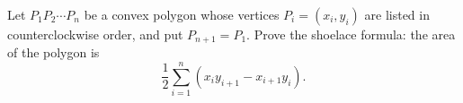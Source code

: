 Let $P_1P_2\cdots P_n$ be a convex polygon whose vertices $P_i=(x_i,y_i)$ are listed in counterclockwise order, and put $P_{n+1}=P_1$. Prove the shoelace formula: the area of the polygon is
\[\dfrac12\sum_{i=1}^{n}\left(x_iy_{i+1}-x_{i+1}y_i\right).\]
